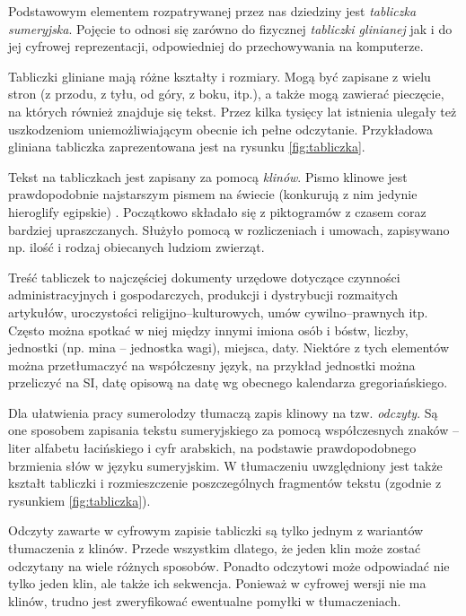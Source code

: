 Podstawowym elementem rozpatrywanej przez nas dziedziny jest \emph{tabliczka sumeryjska}. 
Pojęcie to odnosi się zarówno do fizycznej \emph{tabliczki glinianej} jak i do jej cyfrowej reprezentacji, 
odpowiedniej do przechowywania na komputerze. 

Tabliczki gliniane mają różne kształty i rozmiary. 
Mogą być zapisane z wielu stron (z przodu, z tyłu, od góry, z boku, itp.), a także mogą zawierać pieczęcie, 
na których również znajduje się tekst. Przez kilka tysięcy lat istnienia ulegały też uszkodzeniom uniemożliwiającym 
obecnie ich pełne odczytanie.
Przykładowa gliniana tabliczka zaprezentowana jest na rysunku \ref{fig:tabliczka}.

Tekst na tabliczkach jest zapisany za pomocą \emph{klinów}. Pismo klinowe jest prawdopodobnie najstarszym pismem na świecie 
(konkurują z nim jedynie hieroglify egipskie)  \cite{kuckenburg}. Początkowo składało się z piktogramów z czasem coraz bardziej upraszczanych.
Służyło pomocą w rozliczeniach i umowach, zapisywano np. ilość i rodzaj obiecanych ludziom zwierząt.

Treść tabliczek to najczęściej dokumenty urzędowe dotyczące czynności administracyjnych i gospodarczych, 
produkcji i dystrybucji rozmaitych artykułów, uroczystości religijno--kulturowych, umów cywilno--prawnych itp. \cite{powalka}
Często można spotkać w niej między innymi imiona osób i bóstw, liczby, jednostki (np. mina -- jednostka wagi), %
miejsca, daty. Niektóre z tych elementów można przetłumaczyć na współczesny język, na przykład jednostki można przeliczyć na SI, 
datę opisową na datę wg obecnego kalendarza gregoriańskiego. 

Dla ułatwienia pracy sumerolodzy tłumaczą zapis klinowy na tzw. \emph{odczyty}. 
Są one sposobem zapisania tekstu sumeryjskiego za pomocą współczesnych znaków -- liter alfabetu łacińskiego i cyfr arabskich, 
na podstawie prawdopodobnego brzmienia słów w języku sumeryjskim. 
W tłumaczeniu uwzględniony jest także kształt tabliczki i rozmieszczenie poszczególnych fragmentów tekstu 
(zgodnie z rysunkiem \ref{fig:tabliczka}). 
 
Odczyty zawarte w cyfrowym zapisie tabliczki są tylko jednym z wariantów tłumaczenia z klinów. 
Przede wszystkim dlatego, że jeden klin może zostać odczytany na wiele różnych sposobów. 
Ponadto odczytowi może odpowiadać nie tylko jeden klin, ale także ich sekwencja. 
Ponieważ w cyfrowej wersji nie ma klinów, trudno jest zweryfikować ewentualne pomyłki w tłumaczeniach.

